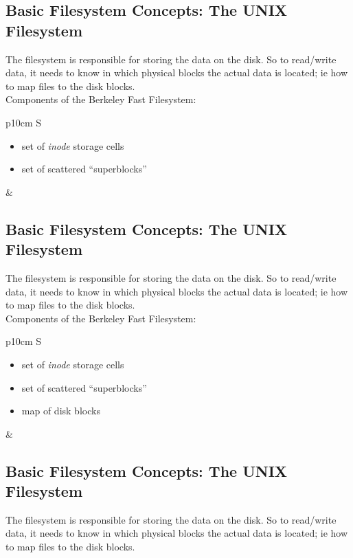 \documentclass[xga]{xdvislides}
\begin{document}
\subsection{Basic Filesystem Concepts: The UNIX Filesystem}
The filesystem is responsible for storing the data on the disk.
So to read/write data, it needs to know in which physical blocks the actual
data is located; ie how to map files to the disk blocks.
\\

Components of the Berkeley Fast Filesystem:
\\

\begin{tabular}{ p{10cm} S }
\begin{itemize}
	\item set of {\em inode} storage cells
	\item set of scattered ``superblocks''
\end{itemize}
&  \\
\end{tabular}

\subsection{Basic Filesystem Concepts: The UNIX Filesystem}
The filesystem is responsible for storing the data on the disk.
So to read/write data, it needs to know in which physical blocks the actual
data is located; ie how to map files to the disk blocks.
\\

Components of the Berkeley Fast Filesystem:
\\

\begin{tabular}{ p{10cm} S }
\begin{itemize}
	\item set of {\em inode} storage cells
	\item set of scattered ``superblocks''
	\item map of disk blocks
\end{itemize}
&  \\
\end{tabular}

\subsection{Basic Filesystem Concepts: The UNIX Filesystem}
The filesystem is responsible for storing the data on the disk.
So to read/write data, it needs to know in which physical blocks the actual
data is located; ie how to map files to the disk blocks.
\\
\end{document}
